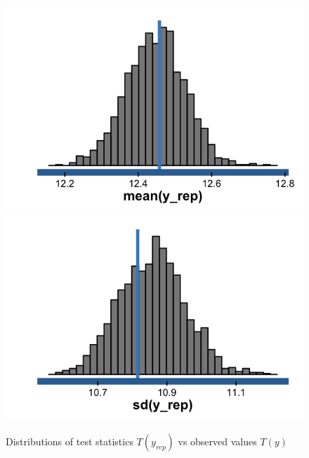 \begin{figure}
\centering
	\includegraphics[scale=0.25]{sections/figs/ck_pp_test_statistics_mean}
	\includegraphics[scale=0.25]{sections/figs/ck_pp_test_statistics_sd}
\caption{Distributions of test statistics $T(y_{rep})$ vs observed values $T(y)$}
\label{fig:ck_pp_test_statistics}
\end{figure}

